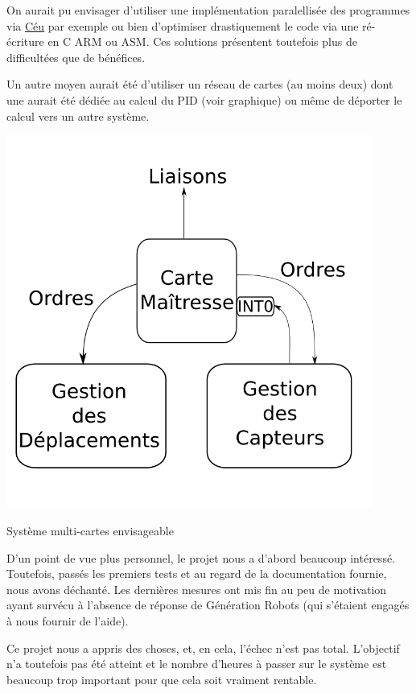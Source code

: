 \documentclass[a4paper]{report}
\begin{document}
On aurait pu envisager d'utiliser une implémentation paralellisée des programmes via \href{http://www.ceu-lang.org/}{Céu} par exemple ou bien d'optimiser drastiquement le code via une ré-écriture en C ARM ou ASM.
Ces solutions présentent toutefois plus de difficultées que de bénéfices.

Un autre moyen aurait été d'utiliser un réseau de cartes (au moins deux) dont une aurait été dédiée au calcul du PID (voir graphique) ou même de déporter le calcul vers un autre système.

\begin{center}
\includegraphics[width=12cm]{annexes/proposition.png}

Système multi-cartes envisageable

\end{center}

D'un point de vue plus personnel, le projet nous a d'abord beaucoup intéressé. Toutefois, passés les premiers tests et au regard de la documentation fournie, nous avons déchanté. Les dernières mesures ont mis fin au peu de motivation ayant survécu à l'absence de réponse de Génération Robots (qui s'étaient engagés à nous fournir de l'aide).

Ce projet nous a appris des choses, et, en cela, l'échec n'est pas total. L'objectif n'a toutefois pas été atteint et le nombre d'heures à passer sur le système est beaucoup trop important pour que cela soit vraiment rentable.
\end{document}
